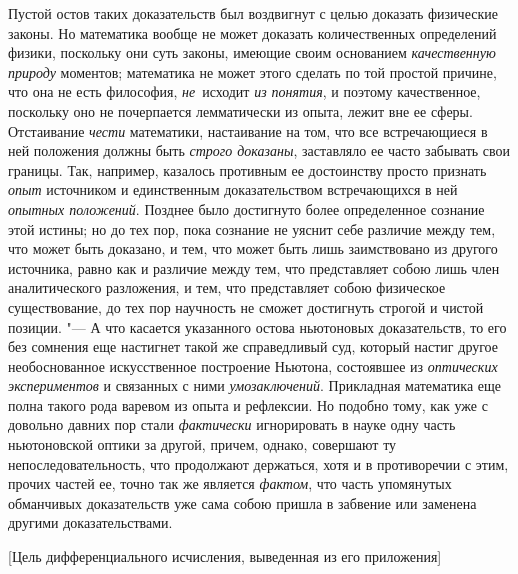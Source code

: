 Пустой остов таких доказательств был воздвигнут с целью доказать физические
законы. Но математика вообще не может доказать количественных определений
физики, поскольку они суть законы, имеющие своим основанием {\em качественную
природу} моментов; математика не может этого сделать по той простой причине,
что она не есть философия, {\em не}~исходит {\em из понятия}, и поэтому
качественное, поскольку оно не почерпается лемматически из опыта, лежит вне ее
сферы. Отстаивание {\em чести} математики, настаивание на том, что все
встречающиеся в ней положения должны быть {\em строго доказаны}, заставляло ее
часто забывать свои границы. Так, например, казалось противным ее достоинству
просто признать {\em опыт} источником и единственным доказательством
встречающихся в ней {\em опытных положений}. Позднее было достигнуто
более определенное сознание этой истины; но до тех пор, пока сознание не уяснит
себе различие между тем, что может быть доказано, и тем, что может быть лишь
заимствовано из другого источника, равно как и различие между тем, что
представляет собою лишь член аналитического разложения, и тем, что представляет
собою физическое существование, до тех пор научность не сможет достигнуть
строгой и чистой позиции. "--- А что касается указанного остова ньютоновых
доказательств, то его без сомнения еще настигнет такой же справедливый суд,
который настиг другое необоснованное искусственное построение Ньютона,
состоявшее из {\em оптических экспериментов} и связанных с ними
{\em умозаключений}. Прикладная математика еще полна такого рода варевом из
опыта и рефлексии. Но подобно тому, как уже с довольно давних пор стали
{\em фактически} игнорировать в науке одну часть ньютоновской оптики за другой,
причем, однако, совершают ту непоследовательность, что продолжают держаться,
хотя и в противоречии с этим, прочих частей ее, точно так же является
{\em фактом}, что часть упомянутых обманчивых доказательств уже сама собою
пришла в забвение или заменена другими доказательствами.

%
{[Цель дифференциального исчисления, выведенная из его приложения]}

